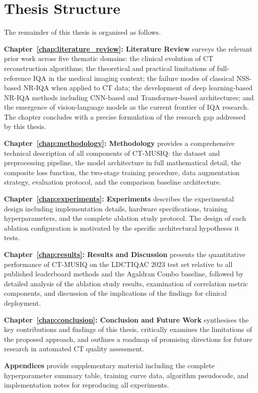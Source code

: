 \section{Thesis Structure}
\label{sec:intro_structure}

The remainder of this thesis is organised as follows.

\textbf{Chapter~\ref{chap:literature_review}: Literature Review} surveys the relevant
prior work across five thematic domains: the clinical evolution of CT reconstruction
algorithms; the theoretical and practical limitations of full-reference IQA in the
medical imaging context; the failure modes of classical NSS-based NR-IQA when applied
to CT data; the development of deep learning-based NR-IQA methods including CNN-based and
Transformer-based architectures; and the emergence of vision-language models as the
current frontier of IQA research. The chapter concludes with a precise formulation of the
research gap addressed by this thesis.

\textbf{Chapter~\ref{chap:methodology}: Methodology} provides a comprehensive technical
description of all components of CT-MUSIQ: the dataset and preprocessing pipeline,
the model architecture in full mathematical detail, the composite loss function, the
two-stage training procedure, data augmentation strategy, evaluation protocol, and the
comparison baseline architecture.

\textbf{Chapter~\ref{chap:experiments}: Experiments} describes the experimental design
including implementation details, hardware specifications, training hyperparameters, and
the complete ablation study protocol. The design of each ablation configuration is
motivated by the specific architectural hypotheses it tests.

\textbf{Chapter~\ref{chap:results}: Results and Discussion} presents the quantitative
performance of CT-MUSIQ on the LDCTIQAC 2023 test set relative to all published
leaderboard methods and the Agaldran Combo baseline, followed by detailed analysis of
the ablation study results, examination of correlation metric components, and discussion
of the implications of the findings for clinical deployment.

\textbf{Chapter~\ref{chap:conclusion}: Conclusion and Future Work} synthesises the key
contributions and findings of this thesis, critically examines the limitations of the
proposed approach, and outlines a roadmap of promising directions for future research
in automated CT quality assessment.

\textbf{Appendices} provide supplementary material including the complete hyperparameter
summary table, training curve data, algorithm pseudocode, and implementation notes for
reproducing all experiments.

